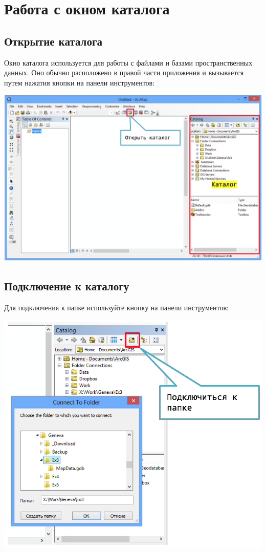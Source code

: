 \documentclass[]{book}
\theoremstyle{definition}
\theoremstyle{definition}
\theoremstyle{definition}
\theoremstyle{remark}
\begin{document}
\hypertarget{appendix--}{%
\appendix}


\hypertarget{manual-catalog}{%
\chapter{Работа с окном каталога}\label{manual-catalog}}

\hypertarget{-}{%
\section{Открытие каталога}\label{-}}

Окно каталога используется для работы с файлами и базами
пространственных данных. Оно обычно расположено в правой части
приложения и вызывается путем нажатия кнопки на панели инструментов:

\includegraphics{images/Appendix/image1.png}

\hypertarget{--}{%
\section{Подключение к каталогу}\label{--}}

Для подключения к папке используйте кнопку на панели инструментов:

\includegraphics{images/Appendix/image2.png}
\end{document}
